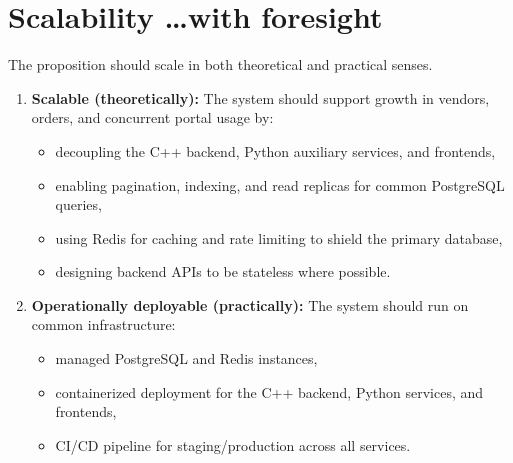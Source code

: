 \documentclass{article}
\begin{document}
\section{Scalability \dots with foresight}
The proposition should scale in both theoretical and practical senses.
\begin{enumerate}
    \item \textbf{Scalable (theoretically):} The system should support growth in vendors,
    orders, and concurrent portal usage by:
    \begin{itemize}
        \item decoupling the C++ backend, Python auxiliary services, and frontends,
        \item enabling pagination, indexing, and read replicas for common PostgreSQL queries,
        \item using Redis for caching and rate limiting to shield the primary database,
        \item designing backend APIs to be stateless where possible.
    \end{itemize}
    \item \textbf{Operationally deployable (practically):} The system should run on common
    infrastructure:
    \begin{itemize}
        \item managed PostgreSQL and Redis instances,
        \item containerized deployment for the C++ backend, Python services, and frontends,
        \item CI/CD pipeline for staging/production across all services.
    \end{itemize}
\end{enumerate}
\end{document}
